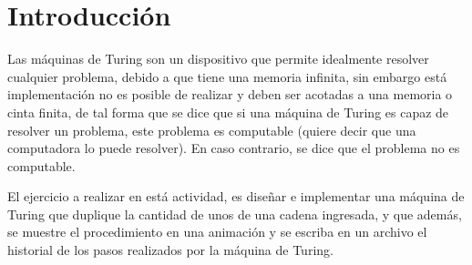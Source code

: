\section{Introducción}
	Las máquinas de Turing son un dispositivo que permite idealmente resolver cualquier problema, debido a que tiene una memoria infinita, sin embargo está implementación no es posible de realizar y deben ser acotadas a una memoria o cinta finita, de tal forma que se dice que si una máquina de Turing es capaz de resolver un problema, este problema es computable (quiere decir que una computadora lo puede resolver). En caso contrario, se dice que el problema no es computable.\cite{LIBRO}

	

	El ejercicio a realizar en está actividad, es diseñar e implementar una máquina de Turing que duplique la cantidad de unos de una cadena ingresada, y que además, se muestre el procedimiento en una animación y se escriba en un archivo el historial de los pasos realizados por la máquina de Turing.

